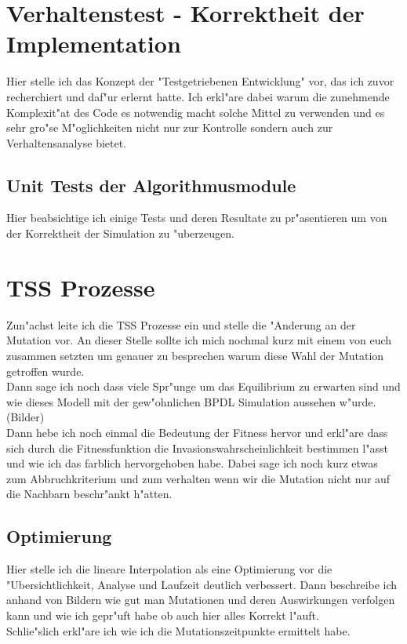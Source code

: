 \documentclass[11pt, a4paper, german]{article}
\begin{document}
\clearpage
\section{Verhaltenstest - Korrektheit der Implementation}
Hier stelle ich das Konzept der "{}Testgetriebenen Entwicklung"{} vor, das ich zuvor recherchiert und daf"ur erlernt hatte. Ich erkl"are dabei warum die zunehmende Komplexit"at des Code es notwendig macht solche Mittel zu verwenden und es sehr gro"se M"oglichkeiten nicht nur zur Kontrolle sondern auch zur Verhaltensanalyse bietet.

	\subsection{Unit Tests der Algorithmusmodule}
	Hier beabsichtige ich einige Tests und deren Resultate zu pr"asentieren um von der Korrektheit der Simulation zu "uberzeugen.
	

\clearpage
\section{TSS Prozesse}
Zun"achst leite ich die TSS Prozesse ein und stelle die "Anderung an der Mutation vor. An dieser Stelle sollte ich mich nochmal kurz mit einem von euch zusammen setzten um genauer zu besprechen warum diese Wahl der Mutation getroffen wurde.\\
Dann sage ich noch dass viele Spr"unge um das Equilibrium zu erwarten sind und wie dieses Modell mit der gew"ohnlichen BPDL Simulation aussehen w"urde. (Bilder)\\
Dann hebe ich noch einmal die Bedeutung der Fitness hervor und erkl"are dass sich durch die Fitnessfunktion die Invasionswahrscheinlichkeit bestimmen l"asst und wie ich das farblich hervorgehoben habe. Dabei sage ich noch kurz etwas zum Abbruchkriterium und zum verhalten wenn wir die Mutation nicht nur auf die Nachbarn beschr"ankt h"atten.\\
	\subsection{Optimierung}
	Hier stelle ich die lineare Interpolation als eine Optimierung vor die "Ubersichtlichkeit, Analyse und Laufzeit deutlich verbessert. Dann beschreibe ich anhand von Bildern wie gut man Mutationen und deren Auswirkungen verfolgen kann und wie ich gepr"uft habe ob auch hier alles Korrekt l"auft.\\
	Schlie"slich erkl"are ich wie ich die Mutationszeitpunkte ermittelt habe.
	
\end{document}
